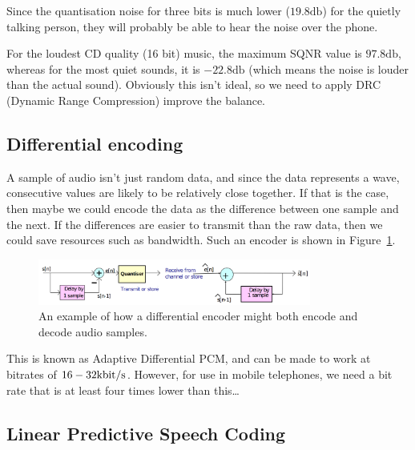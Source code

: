 Since the quantisation noise for three bits is much lower ($19.8\si{\decibel}$)
for the quietly talking person, they will probably be able to hear the noise
over the phone.


For the loudest CD quality (16 bit) music, the maximum SQNR value is
$97.8\si{\decibel}$, whereas for the most quiet sounds, it is
$-22.8\si{\decibel}$ (which means the noise is louder than the actual sound).
Obviously this isn't ideal, so we need to apply DRC (Dynamic Range Compression)
improve the balance.

\subsection{Differential encoding}

A sample of audio isn't just random data, and since the data represents a wave,
consecutive values are likely to be relatively close together. If that is the
case, then maybe we could encode the data as the difference between one sample
and the next. If the differences are easier to transmit than the raw data, then
we could save resources such as bandwidth. Such an encoder is shown in
Figure~\ref{differential-encoder}.

\begin{figure}[H]
  \centering
  \includegraphics[width=0.8\textwidth]{images/differential-encoder}
  \caption{An example of how a differential encoder might both encode and decode
  audio samples.}
  \label{differential-encoder}
\end{figure}


This is known as Adaptive Differential PCM, and can be made to work at bitrates
of $16-32\si{\kilo\bit\per\second}$. However, for use in mobile telephones, we
need a bit rate that is at least four times lower than this\dots

\subsection{Linear Predictive Speech Coding}

